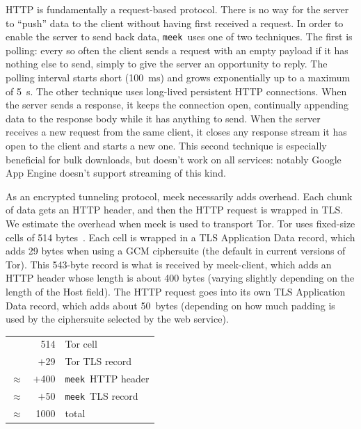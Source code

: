 \documentclass[conference]{IEEEtran}
\newcommand{\meekclient}{\mbox{meek-client}\xspace}
\newcommand{\meek}{\texttt{meek}\xspace}
\begin{document}
HTTP is fundamentally a request-based protocol.
There is no way for the server to ``push'' data to the client without
having first received a request.
In order to enable the server to send back data,
\meek\ uses one of two techniques.
The first is polling:
every so often the client sends a request with an empty payload
if it has nothing else to send,
simply to give the server an opportunity to reply.
The polling interval starts short (100~ms) and grows exponentially
up to a maximum of 5~s.
The other technique
uses long-lived persistent HTTP connections.
When the server sends a response, it keeps the connection open,
continually appending data to the response body while it has anything to send.
When the server receives a new request from the same client,
it closes any response stream it has open to the client and starts a new one.
This second technique is especially beneficial for bulk downloads,
but doesn't work on all services:
notably Google App Engine doesn't support streaming of this kind.

As an encrypted tunneling protocol, meek necessarily adds overhead.
Each chunk of data gets an HTTP header, and then the HTTP
request is wrapped in TLS.
We estimate the overhead when meek is used to transport Tor.
Tor uses fixed-size cells of 514 bytes~\cite[Section~0.2]{tor-spec}.
Each cell is wrapped in a TLS Application Data record, which adds 29 bytes
when using a GCM ciphersuite (the default in current versions of Tor).
This 543-byte record is what is received by \meekclient,
which adds an HTTP header whose length is about 400 bytes
(varying slightly depending on the length of the Host field).
The HTTP request goes into its own TLS Application Data record,
which adds about 50~bytes
(depending on how much padding is used by the ciphersuite selected by the web service).


\begin{center}
\begin{tabular}{r@{}r l}
          &    514 & Tor cell \\
          &  $+$29 & Tor TLS record \\
$\approx$ & $+$400 & \meek\ HTTP header \\
$\approx$ &  $+$50 & \meek\ TLS record \\
\hline
$\approx$ &   1000 & total
\end{tabular}
\end{center}
\end{document}
